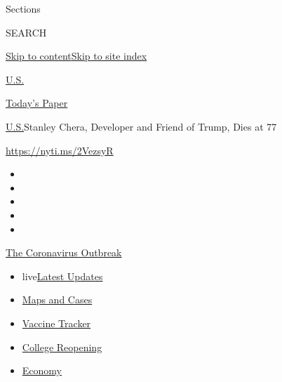 Sections

SEARCH

\protect\hyperlink{site-content}{Skip to
content}\protect\hyperlink{site-index}{Skip to site index}

\href{https://www.nytimes.com/section/us}{U.S.}

\href{https://myaccount.nytimes.com/auth/login?response_type=cookie\&client_id=vi}{}

\href{https://www.nytimes.com/section/todayspaper}{Today's Paper}

\href{/section/us}{U.S.}\textbar{}Stanley Chera, Developer and Friend of
Trump, Dies at 77

\url{https://nyti.ms/2VezsyR}

\begin{itemize}
\item
\item
\item
\item
\item
\end{itemize}

\href{https://www.nytimes.com/news-event/coronavirus?action=click\&pgtype=Article\&state=default\&region=TOP_BANNER\&context=storylines_menu}{The
Coronavirus Outbreak}

\begin{itemize}
\tightlist
\item
  live\href{https://www.nytimes.com/2020/08/03/world/coronavirus-covid-19.html?action=click\&pgtype=Article\&state=default\&region=TOP_BANNER\&context=storylines_menu}{Latest
  Updates}
\item
  \href{https://www.nytimes.com/interactive/2020/us/coronavirus-us-cases.html?action=click\&pgtype=Article\&state=default\&region=TOP_BANNER\&context=storylines_menu}{Maps
  and Cases}
\item
  \href{https://www.nytimes.com/interactive/2020/science/coronavirus-vaccine-tracker.html?action=click\&pgtype=Article\&state=default\&region=TOP_BANNER\&context=storylines_menu}{Vaccine
  Tracker}
\item
  \href{https://www.nytimes.com/2020/08/02/us/covid-college-reopening.html?action=click\&pgtype=Article\&state=default\&region=TOP_BANNER\&context=storylines_menu}{College
  Reopening}
\item
  \href{https://www.nytimes.com/live/2020/08/03/business/stock-market-today-coronavirus?action=click\&pgtype=Article\&state=default\&region=TOP_BANNER\&context=storylines_menu}{Economy}
\end{itemize}

